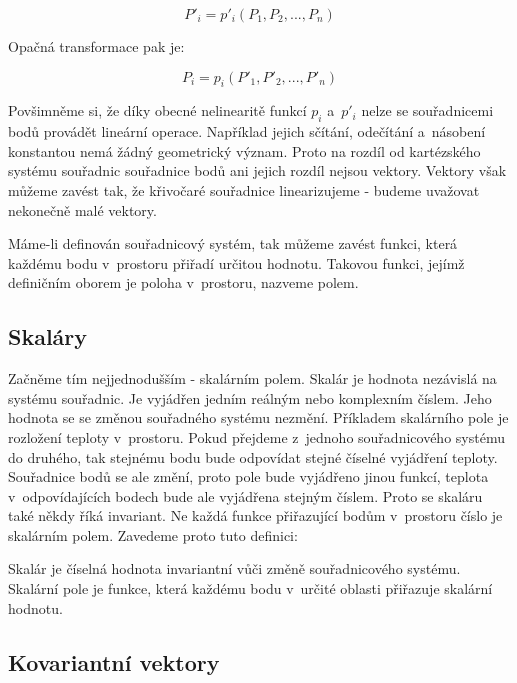 \begin{equation}
P'_i = p'_i(P_1, P_2, ..., P_n)
\end{equation}

Opačná transformace pak je:

\begin{equation}
P_i = p_i(P'_1, P'_2, ..., P'_n)
\end{equation}

Povšimněme si, že díky obecné nelinearitě funkcí \(p_i\) a~\(p'_i\) nelze se souřadnicemi bodů provádět lineární operace. Například jejich sčítání, odečítání a~násobení konstantou nemá žádný geometrický význam. Proto na rozdíl od kartézského systému souřadnic souřadnice bodů ani jejich rozdíl nejsou vektory. Vektory však můžeme zavést tak, že křivočaré souřadnice linearizujeme - budeme uvažovat nekonečně malé vektory.

Máme-li definován souřadnicový systém, tak můžeme zavést funkci, která každému bodu v~prostoru přiřadí určitou hodnotu. Takovou funkci, jejímž definičním oborem je poloha v~prostoru, nazveme polem. 

\subsection{Skaláry}

Začněme tím nejjednodušším - skalárním polem. Skalár je hodnota nezávislá na systému souřadnic. Je vyjádřen jedním reálným nebo komplexním číslem. Jeho hodnota se se změnou souřadného systému nezmění. Příkladem skalárního pole je rozložení teploty v~prostoru. Pokud přejdeme z~jednoho souřadnicového systému do druhého, tak stejnému bodu bude odpovídat stejné číselné vyjádření teploty. Souřadnice bodů se ale změní, proto pole bude vyjádřeno jinou funkcí, teplota v~odpovídajících bodech bude ale vyjádřena stejným číslem. Proto se skaláru také někdy říká invariant. Ne každá funkce přiřazující bodům v~prostoru číslo je skalárním polem. Zavedeme proto tuto definici:

\begin{fact}
Skalár je číselná hodnota invariantní vůči změně souřadnicového systému. Skalární pole je funkce, která každému bodu v~určité oblasti přiřazuje skalární hodnotu.
\end{fact}

\subsection{Kovariantní vektory}

